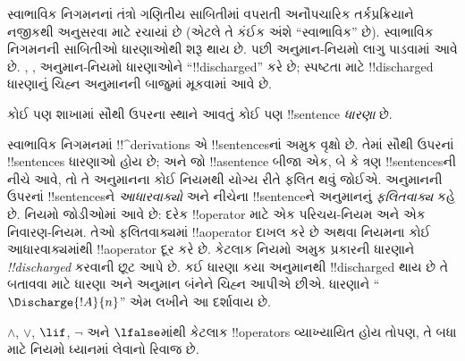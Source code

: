 \documentclass[../../../include/open-logic-section]{subfiles}
\begin{document}
      {}
      {}


\begin{explain}
સ્વાભાવિક નિગમનનાં તંત્રો ગણિતીય સાબિતીમાં વપરાતી અનૌપચારિક
તર્કપ્રક્રિયાને નજીકથી અનુસરવા માટે રચાયાં છે (એટલે તે કંઈક અંશે
``સ્વાભાવિક'' છે). સ્વાભાવિક નિગમનની સાબિતીઓ ધારણાઓથી શરૂ થાય છે.
પછી અનુમાન-નિયમો લાગુ પાડવામાં આવે છે. \Intro{\lnot}, \Intro{\lif},
અનુમાન-નિયમો ધારણાઓને ``!!{discharged}'' કરે છે; સ્પષ્ટતા માટે
!!{discharged} ધારણાનું ચિહ્ન અનુમાનની બાજુમાં મૂકવામાં આવે છે.
\end{explain}

\begin{defn}[ધારણા]
કોઈ પણ શાખામાં સૌથી ઉપરના સ્થાને આવતું કોઈ પણ !!{sentence}
\emph{ધારણા} છે.
\end{defn}

સ્વાભાવિક નિગમનમાં !!^{derivation}s એ !!{sentence}sનાં અમુક વૃક્ષો છે.
તેમાં સૌથી ઉપરનાં !!{sentence}s ધારણાઓ હોય છે; અને જો !!a{sentence}
બીજા એક, બે કે ત્રણ !!{sentence}sની નીચે આવે, તો તે અનુમાનના કોઈ નિયમથી
યોગ્ય રીતે ફલિત થવું જોઈએ. અનુમાનની ઉપરનાં !!{sentence}sને
\emph{આધારવાક્યો} અને નીચેના !!{sentence}ને અનુમાનનું \emph{ફલિતવાક્ય}
કહે છે. નિયમો જોડીઓમાં આવે છે: દરેક !!{operator} માટે એક પરિચય-નિયમ
અને એક નિવારણ-નિયમ. તેઓ ફલિતવાક્યમાં !!a{operator} દાખલ કરે છે અથવા
નિયમના કોઈ આધારવાક્યમાંથી !!a{operator} દૂર કરે છે. કેટલાક નિયમો અમુક
પ્રકારની ધારણાને \emph{!!{discharged}} કરવાની છૂટ આપે છે. કઈ ધારણા કયા
અનુમાનથી !!{discharged} થાય છે તે બતાવવા માટે ધારણા અને અનુમાન બંનેને
ચિહ્ન આપીએ છીએ. ધારણાને ``$\Discharge{!A}{n}$'' એમ લખીને આ દર્શાવાય છે.


%
	{$\land$, $\lor$, $\lif$, $\lnot$ અને $\lfalse$માંથી કેટલાક
!!{operator}s વ્યાખ્યાયિત હોય તોપણ, તે બધા માટે નિયમો ધ્યાનમાં લેવાનો
રિવાજ છે.}
\end{document}
